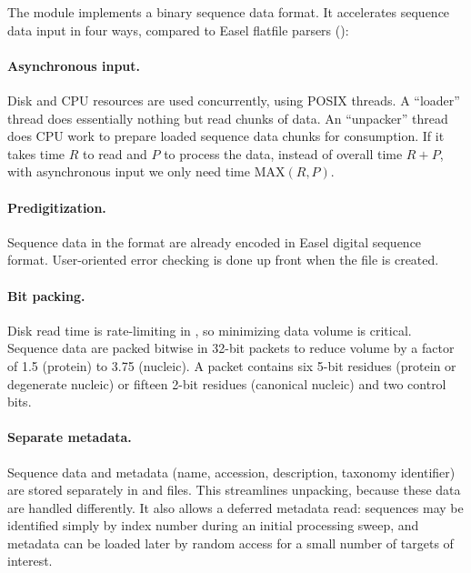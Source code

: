 The  module implements a binary sequence data
format. It accelerates sequence data input in four ways, compared to
Easel flatfile parsers ():

\paragraph{Asynchronous input.}
   Disk and CPU resources are used concurrently, using POSIX threads.
   A ``loader'' thread does essentially nothing but read chunks of
   data.  An ``unpacker'' thread does CPU work to prepare loaded
   sequence data chunks for consumption. If it takes time $R$ to read
   and $P$ to process the data, instead of overall time $R+P$, with
   asynchronous input we only need time $\mathrm{MAX}(R,P)$.

\paragraph{Predigitization.} 
  Sequence data in the  format are already encoded in
  Easel digital sequence format.  User-oriented error checking is done
  up front when the  file is created.
                                                                     
\paragraph{Bit packing.} 
  Disk read time is rate-limiting in , so minimizing
  data volume is critical.  Sequence data are packed bitwise
  in 32-bit packets to reduce volume by a factor of 1.5 (protein) to
  3.75 (nucleic). A packet contains six 5-bit residues (protein or
  degenerate nucleic) or fifteen 2-bit residues (canonical nucleic) and two
  control bits.
                                                                     
\paragraph{Separate metadata.} 
  Sequence data and metadata (name, accession, description, taxonomy
  identifier) are stored separately in  and 
  files. This streamlines unpacking, because these data are handled
  differently.  It also allows a deferred metadata read: sequences may
  be identified simply by index number during an initial processing
  sweep, and metadata can be loaded later by random access for a small
  number of targets of interest.

